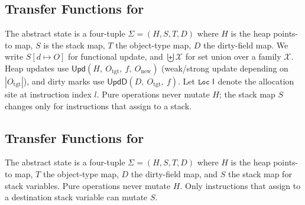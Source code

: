 \subsection{Transfer Functions for \spytecode}
\label{subsec:transfers}

The abstract state is a four-tuple \(\Sigma = (H,S,T,D)\) where \(H\) is the heap
points-to map, \(S\) is the
stack map, \(T\) the object-type map, \(D\) the dirty-field map.
We write \(S[d \mapsto O]\) for functional update, and
\(\biguplus\mathcal{X}\) for set union over a family \(\mathcal{X}\).
Heap updates use
\(\mathsf{Upd}(H,\ O_{\mathrm{tgt}},\ f,\ O_{\mathrm{new}})\)
(weak/strong update depending on \(|O_{\mathrm{tgt}}|\)),
and dirty marks use
\(\mathsf{UpdD}(D,\ O_{\mathrm{tgt}},\ f)\).
Let \(\textsf{\texttt{\small Loc}~{l}}\) denote the allocation site at instruction index \(l\).
Pure operations never mutate \(H\); the stack map \(S\) changes only for
instructions that assign to a stack.
\subsection{Transfer Functions for \spytecode}
\label{subsec:transfers}

The abstract state is a four-tuple \(\Sigma=(H,S,T,D)\) where \(H\) is the heap
points-to map, \(T\) the object-type map, \(D\) the dirty-field map, and \(S\)
the stack map for stack variables.  Pure operations never mutate \(H\).  Only
instructions that assign to a destination stack variable can mutate \(S\).

